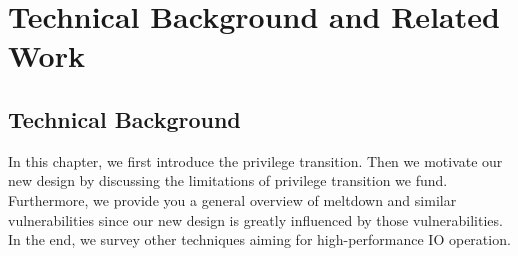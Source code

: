 \chapter{Technical Background and Related Work}
\label{sec:state}








\section{Technical Background}
In this chapter, we first introduce the privilege transition. Then we motivate our new 
design by discussing the limitations of privilege 
transition we fund. Furthermore, we provide you a general overview of 
meltdown and similar vulnerabilities since our new design is greatly 
influenced by those vulnerabilities. In the end, we survey other techniques 
aiming for high-performance IO operation.

